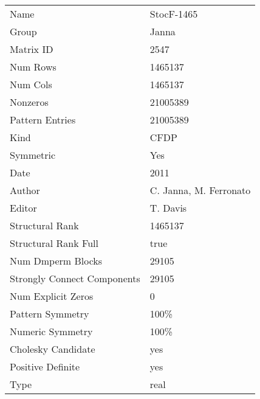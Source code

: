 \begin{tabular}{ll}
\midrule
                       Name &                           StocF-1465 \\
                      Group &                                Janna \\
                  Matrix ID &                                 2547 \\
                   Num Rows &                              1465137 \\
                   Num Cols &                              1465137 \\
                   Nonzeros &                             21005389 \\
            Pattern Entries &                             21005389 \\
                       Kind & CFDP \\
                  Symmetric &                                  Yes \\
                       Date &                                 2011 \\
                     Author &               C. Janna, M. Ferronato \\
                     Editor &                             T. Davis \\
            Structural Rank &                              1465137 \\
       Structural Rank Full &                                 true \\
          Num Dmperm Blocks &                                29105 \\
Strongly Connect Components &                                29105 \\
         Num Explicit Zeros &                                    0 \\
           Pattern Symmetry &                                 100\% \\
           Numeric Symmetry &                                 100\% \\
         Cholesky Candidate &                                  yes \\
          Positive Definite &                                  yes \\
                       Type &                                 real \\
\bottomrule
\end{tabular}
